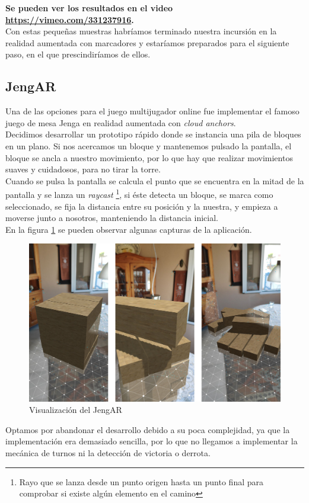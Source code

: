 \textbf{Se pueden ver los resultados en el video \url{https://vimeo.com/331237916}.}\\

Con estas pequeñas muestras habríamos terminado nuestra incursión en la realidad aumentada con marcadores y estaríamos preparados para el siguiente paso, en el que prescindiríamos de ellos.

\newpage
\subsection{JengAR}
Una de las opciones para el juego multijugador online fue implementar el famoso juego de mesa Jenga\cite{jenga} en realidad aumentada con \textit{cloud anchors}. \\
Decidimos desarrollar un prototipo rápido donde se instancia una pila de bloques en un plano. Si nos acercamos un bloque y mantenemos pulsado la pantalla, el bloque se ancla a nuestro movimiento, por lo que hay que realizar movimientos suaves y cuidadosos, para no tirar la torre.\\
Cuando se pulsa la pantalla se calcula el punto que se encuentra en la mitad de la pantalla y se lanza un \textit{raycast} \footnote{Rayo que se lanza desde un punto origen hasta un punto final para comprobar si existe algún elemento en el camino}, si éste detecta un bloque, se marca como seleccionado, se fija la distancia entre su posición y la nuestra, y empieza a moverse junto a nosotros, manteniendo la distancia inicial.\\
En la figura \ref{JenAR} se pueden observar algunas capturas de la aplicación.
\begin{figure}[H]
    \centering
    \includegraphics[width=\linewidth]{Images/Jenga.jpg}
    \caption{Visualización del JengAR}
    \label{JenAR}
\end{figure}
Optamos por abandonar el desarrollo debido a su poca complejidad, ya que la implementación era demasiado sencilla, por lo que no llegamos a implementar la mecánica de turnos ni la detección de victoria o derrota.\\

